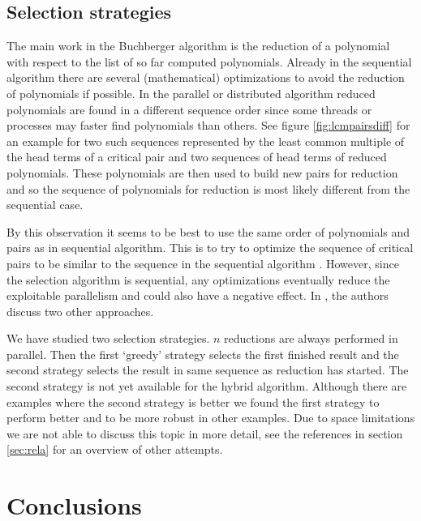 \documentclass[10pt,twocolumn,a4paper]{article}
\begin{document}
\subsection{Selection strategies} \label{sec:select}

The main work in the Buchberger algorithm is the reduction of a
polynomial with respect to the list of so far computed polynomials.
Already in the sequential algorithm there are several (mathematical)
optimizations to avoid the reduction of polynomials if possible. In
the parallel or distributed algorithm reduced polynomials are found in
a different sequence order since some threads or processes may faster
find polynomials than others. 
See figure \ref{fig:lcmpairsdiff} for an example for two such
sequences represented by the least common multiple of the head terms
of a critical pair and two sequences of head terms of reduced polynomials.
These polynomials are then used to build new pairs for reduction and
so the sequence of polynomials for reduction is most likely different
from the sequential case.

By this observation it seems to be best to use the same order of
polynomials and pairs as in sequential algorithm.  This is to try to
optimize the sequence of critical pairs to be similar to the sequence
in the sequential algorithm \cite{AttardiTraverso:1996}.
However, since the selection algorithm is sequential, any
optimizations eventually reduce the exploitable parallelism and could
also have a negative effect.
In \cite{Amrhein:1996}, the authors discuss two other approaches.  

We have studied two selection strategies.  $n$ reductions are always
performed in parallel.  Then the first `greedy' strategy selects the
first finished result and the second strategy selects the result in
same sequence as reduction has started.  The second strategy is not
yet available for the hybrid algorithm. Although there are examples
where the second strategy is better we found the first strategy to
perform better and to be more robust in other examples.
Due to space limitations we are not able to discuss this topic in more detail,
see the references in section \ref{sec:rela} for an overview of other attempts.


\section{Conclusions} 
\end{document}

